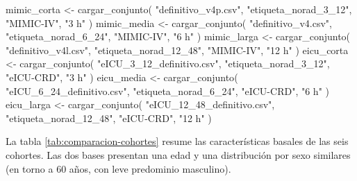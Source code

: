 \documentclass[
  spanish,
  a4paper,
  12pt,
  twoside]{memoir}
\newenvironment{Shaded}{\begin{snugshade}}{\end{snugshade}}
\newcommand{\FunctionTok}[1]{\textcolor[rgb]{0.28,0.35,0.67}{#1}}
\newcommand{\NormalTok}[1]{\textcolor[rgb]{0.00,0.23,0.31}{#1}}
\newcommand{\OtherTok}[1]{\textcolor[rgb]{0.00,0.23,0.31}{#1}}
\newcommand{\StringTok}[1]{\textcolor[rgb]{0.13,0.47,0.30}{#1}}
\begin{document}
\begin{Shaded}
\begin{Highlighting}[]
\NormalTok{mimic\_corta }\OtherTok{\textless{}{-}} \FunctionTok{cargar\_conjunto}\NormalTok{(}
  \StringTok{"definitivo\_v4p.csv"}\NormalTok{, }\StringTok{"etiqueta\_norad\_3\_12"}\NormalTok{, }\StringTok{"MIMIC{-}IV"}\NormalTok{, }\StringTok{"3 h"}
\NormalTok{)}
\NormalTok{mimic\_media }\OtherTok{\textless{}{-}} \FunctionTok{cargar\_conjunto}\NormalTok{(}
  \StringTok{"definitivo\_v4.csv"}\NormalTok{, }\StringTok{"etiqueta\_norad\_6\_24"}\NormalTok{, }\StringTok{"MIMIC{-}IV"}\NormalTok{, }\StringTok{"6 h"}
\NormalTok{)}
\NormalTok{mimic\_larga }\OtherTok{\textless{}{-}} \FunctionTok{cargar\_conjunto}\NormalTok{(}
  \StringTok{"definitivo\_v4l.csv"}\NormalTok{, }\StringTok{"etiqueta\_norad\_12\_48"}\NormalTok{,}
  \StringTok{"MIMIC{-}IV"}\NormalTok{, }\StringTok{"12 h"}
\NormalTok{)}
\NormalTok{eicu\_corta }\OtherTok{\textless{}{-}} \FunctionTok{cargar\_conjunto}\NormalTok{(}
  \StringTok{"eICU\_3\_12\_definitivo.csv"}\NormalTok{, }\StringTok{"etiqueta\_norad\_3\_12"}\NormalTok{,}
  \StringTok{"eICU{-}CRD"}\NormalTok{, }\StringTok{"3 h"}
\NormalTok{)}
\NormalTok{eicu\_media }\OtherTok{\textless{}{-}} \FunctionTok{cargar\_conjunto}\NormalTok{(}
  \StringTok{"eICU\_6\_24\_definitivo.csv"}\NormalTok{, }\StringTok{"etiqueta\_norad\_6\_24"}\NormalTok{,}
  \StringTok{"eICU{-}CRD"}\NormalTok{, }\StringTok{"6 h"}
\NormalTok{)}
\NormalTok{eicu\_larga }\OtherTok{\textless{}{-}} \FunctionTok{cargar\_conjunto}\NormalTok{(}
  \StringTok{"eICU\_12\_48\_definitivo.csv"}\NormalTok{, }\StringTok{"etiqueta\_norad\_12\_48"}\NormalTok{,}
  \StringTok{"eICU{-}CRD"}\NormalTok{, }\StringTok{"12 h"}
\NormalTok{)}
\end{Highlighting}
\end{Shaded}

La tabla \ref{tab:comparacion-cohortes} resume las características
basales de las seis cohortes. Las dos bases presentan una edad y una
distribución por sexo similares (en torno a 60 años, con leve predominio
masculino).
\end{document}
